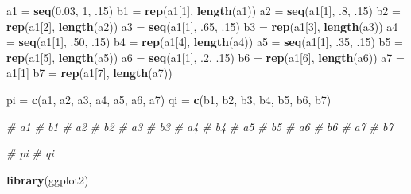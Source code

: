 \documentclass[]{article}
\newenvironment{Shaded}{\begin{snugshade}}{\end{snugshade}}
\newcommand{\KeywordTok}[1]{\textcolor[rgb]{0.13,0.29,0.53}{\textbf{#1}}}
\newcommand{\DecValTok}[1]{\textcolor[rgb]{0.00,0.00,0.81}{#1}}
\newcommand{\FloatTok}[1]{\textcolor[rgb]{0.00,0.00,0.81}{#1}}
\newcommand{\StringTok}[1]{\textcolor[rgb]{0.31,0.60,0.02}{#1}}
\newcommand{\CommentTok}[1]{\textcolor[rgb]{0.56,0.35,0.01}{\textit{#1}}}
\newcommand{\NormalTok}[1]{#1}
\begin{document}
\begin{Shaded}
\begin{Highlighting}[]
\NormalTok{a1 =}\StringTok{ }\KeywordTok{seq}\NormalTok{(}\FloatTok{0.03}\NormalTok{, }\DecValTok{1}\NormalTok{, .}\DecValTok{15}\NormalTok{)}
\NormalTok{b1 =}\StringTok{ }\KeywordTok{rep}\NormalTok{(a1[}\DecValTok{1}\NormalTok{], }\KeywordTok{length}\NormalTok{(a1))}
\NormalTok{a2 =}\StringTok{ }\KeywordTok{seq}\NormalTok{(a1[}\DecValTok{1}\NormalTok{], .}\DecValTok{8}\NormalTok{, .}\DecValTok{15}\NormalTok{)}
\NormalTok{b2 =}\StringTok{ }\KeywordTok{rep}\NormalTok{(a1[}\DecValTok{2}\NormalTok{], }\KeywordTok{length}\NormalTok{(a2))}
\NormalTok{a3 =}\StringTok{ }\KeywordTok{seq}\NormalTok{(a1[}\DecValTok{1}\NormalTok{], .}\DecValTok{65}\NormalTok{, .}\DecValTok{15}\NormalTok{)}
\NormalTok{b3 =}\StringTok{ }\KeywordTok{rep}\NormalTok{(a1[}\DecValTok{3}\NormalTok{], }\KeywordTok{length}\NormalTok{(a3))}
\NormalTok{a4 =}\StringTok{ }\KeywordTok{seq}\NormalTok{(a1[}\DecValTok{1}\NormalTok{], .}\DecValTok{50}\NormalTok{, .}\DecValTok{15}\NormalTok{)}
\NormalTok{b4 =}\StringTok{ }\KeywordTok{rep}\NormalTok{(a1[}\DecValTok{4}\NormalTok{], }\KeywordTok{length}\NormalTok{(a4))}
\NormalTok{a5 =}\StringTok{ }\KeywordTok{seq}\NormalTok{(a1[}\DecValTok{1}\NormalTok{], .}\DecValTok{35}\NormalTok{, .}\DecValTok{15}\NormalTok{)}
\NormalTok{b5 =}\StringTok{ }\KeywordTok{rep}\NormalTok{(a1[}\DecValTok{5}\NormalTok{], }\KeywordTok{length}\NormalTok{(a5))}
\NormalTok{a6 =}\StringTok{ }\KeywordTok{seq}\NormalTok{(a1[}\DecValTok{1}\NormalTok{], .}\DecValTok{2}\NormalTok{, .}\DecValTok{15}\NormalTok{)}
\NormalTok{b6 =}\StringTok{ }\KeywordTok{rep}\NormalTok{(a1[}\DecValTok{6}\NormalTok{], }\KeywordTok{length}\NormalTok{(a6))}
\NormalTok{a7 =}\StringTok{ }\NormalTok{a1[}\DecValTok{1}\NormalTok{]}
\NormalTok{b7 =}\StringTok{ }\KeywordTok{rep}\NormalTok{(a1[}\DecValTok{7}\NormalTok{], }\KeywordTok{length}\NormalTok{(a7))}


\NormalTok{pi =}\StringTok{ }\KeywordTok{c}\NormalTok{(a1, a2, a3, a4, a5, a6, a7)}
\NormalTok{qi =}\StringTok{ }\KeywordTok{c}\NormalTok{(b1, b2, b3, b4, b5, b6, b7)}

\CommentTok{# a1}
\CommentTok{# b1}
\CommentTok{# a2}
\CommentTok{# b2}
\CommentTok{# a3}
\CommentTok{# b3}
\CommentTok{# a4}
\CommentTok{# b4}
\CommentTok{# a5}
\CommentTok{# b5}
\CommentTok{# a6}
\CommentTok{# b6}
\CommentTok{# a7}
\CommentTok{# b7}

\CommentTok{# pi }
\CommentTok{# qi }


\KeywordTok{library}\NormalTok{(ggplot2)}
\end{Highlighting}
\end{Shaded}
\end{document}
